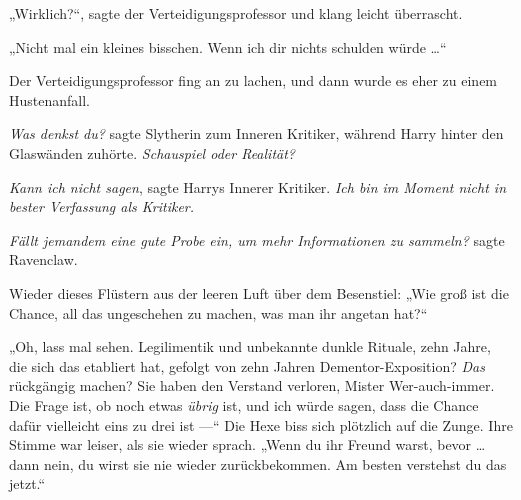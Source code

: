 „Wirklich?“, sagte der Verteidigungsprofessor und klang leicht überrascht.

„Nicht mal ein kleines bisschen. Wenn ich dir nichts schulden würde …“

Der Verteidigungsprofessor fing an zu lachen, und dann wurde es eher zu einem Hustenanfall.

\emph{Was denkst du?} sagte Slytherin zum Inneren Kritiker, während Harry hinter den Glaswänden zuhörte. \emph{Schauspiel oder Realität?}

\emph{Kann ich nicht sagen}, sagte Harrys Innerer Kritiker. \emph{Ich bin im Moment nicht in bester Verfassung als Kritiker.}

\emph{Fällt jemandem eine gute Probe ein, um mehr Informationen zu sammeln?} sagte Ravenclaw.

Wieder dieses Flüstern aus der leeren Luft über dem Besenstiel:
„Wie groß ist die Chance, all das ungeschehen zu machen, was man ihr angetan hat?“

„Oh, lass mal sehen. Legilimentik und unbekannte dunkle Rituale, zehn Jahre, die sich das etabliert hat, gefolgt von zehn Jahren Dementor-Exposition? \emph{Das} rückgängig machen? Sie haben den Verstand verloren, Mister Wer-auch-immer. Die Frage ist, ob noch etwas \emph{übrig} ist, und ich würde sagen, dass die Chance dafür vielleicht eins zu drei ist —“ Die Hexe biss sich plötzlich auf die Zunge. Ihre Stimme war leiser, als sie wieder sprach.
„Wenn du ihr Freund warst, bevor … dann nein, du wirst sie nie wieder zurückbekommen. Am besten verstehst du das jetzt.“

